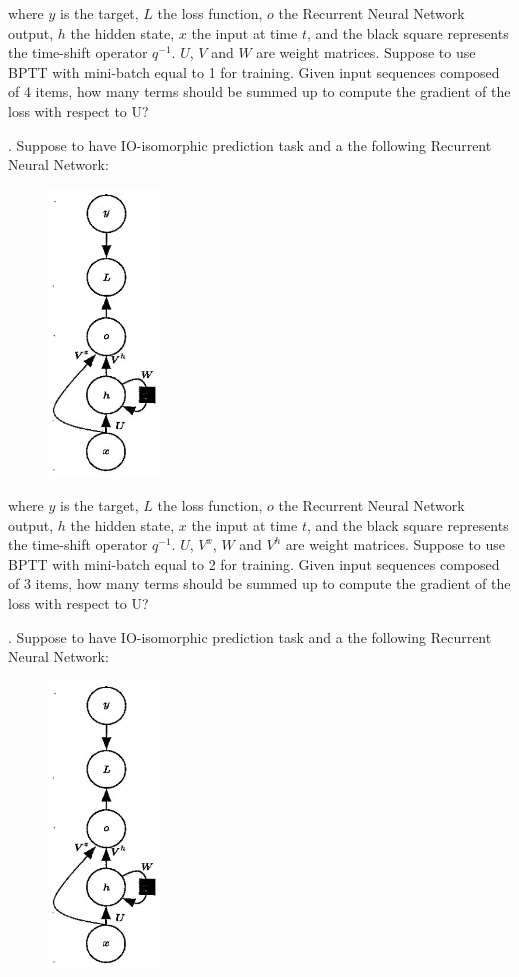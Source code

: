 where $y$ is the target, $L$ the loss function, $o$ the Recurrent Neural Network output, $h$ the hidden state, $x$ the input at time $t$, and the black square represents the time-shift operator $q^{-1}$. $U$, $V$ and $W$ are weight matrices. Suppose to use BPTT with mini-batch equal to 1 for training. Given input sequences composed of 4 items, how many terms should be summed up to compute the gradient of the loss with respect to U?


. Suppose to have IO-isomorphic prediction task and a the following Recurrent Neural Network:

\begin{figure}[h]
    \centering
    \includegraphics[width=3cm]{Images/io-isomorphic-rnn.jpg}
    \label{fig:io-rnn}
\end{figure}

where $y$ is the target, $L$ the loss function, $o$ the Recurrent Neural Network output, $h$ the hidden state, $x$ the input at time $t$, and the black square represents the time-shift operator $q^{-1}$. $U$, $V^{x}$, $W$ and $V^{h}$ are weight matrices. Suppose to use BPTT with mini-batch equal to 2 for training. Given input sequences composed of 3 items, how many terms should be summed up to compute the gradient of the loss with respect to U?

\newpage
{}. Suppose to have IO-isomorphic prediction task and a the following Recurrent Neural Network:

\begin{figure}[h]
    \centering
    \includegraphics[width=3cm]{Images/io-isomorphic-rnn.jpg}
    \label{fig:io-rnn}
\end{figure}

